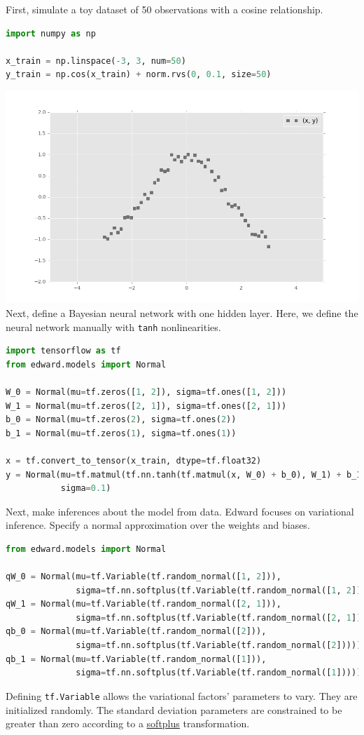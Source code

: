 First, simulate a toy dataset of 50 observations with a cosine relationship.
\begin{lstlisting}[language=Python]
import numpy as np

x_train = np.linspace(-3, 3, num=50)
y_train = np.cos(x_train) + norm.rvs(0, 0.1, size=50)
\end{lstlisting}
\includegraphics[width=700px]{images/getting-started-fig0.png}
Next, define a Bayesian neural network with one hidden layer. Here, we
define the neural network manually with \texttt{tanh} nonlinearities.
\begin{lstlisting}[language=Python]
import tensorflow as tf
from edward.models import Normal

W_0 = Normal(mu=tf.zeros([1, 2]), sigma=tf.ones([1, 2]))
W_1 = Normal(mu=tf.zeros([2, 1]), sigma=tf.ones([2, 1]))
b_0 = Normal(mu=tf.zeros(2), sigma=tf.ones(2))
b_1 = Normal(mu=tf.zeros(1), sigma=tf.ones(1))

x = tf.convert_to_tensor(x_train, dtype=tf.float32)
y = Normal(mu=tf.matmul(tf.nn.tanh(tf.matmul(x, W_0) + b_0), W_1) + b_1,
           sigma=0.1)
\end{lstlisting}
Next, make inferences about the model from data.
Edward focuses on variational inference. Specify a normal
approximation over the weights and biases.
\begin{lstlisting}[language=Python]
from edward.models import Normal

qW_0 = Normal(mu=tf.Variable(tf.random_normal([1, 2])),
              sigma=tf.nn.softplus(tf.Variable(tf.random_normal([1, 2]))))
qW_1 = Normal(mu=tf.Variable(tf.random_normal([2, 1])),
              sigma=tf.nn.softplus(tf.Variable(tf.random_normal([2, 1]))))
qb_0 = Normal(mu=tf.Variable(tf.random_normal([2])),
              sigma=tf.nn.softplus(tf.Variable(tf.random_normal([2]))))
qb_1 = Normal(mu=tf.Variable(tf.random_normal([1])),
              sigma=tf.nn.softplus(tf.Variable(tf.random_normal([1]))))
\end{lstlisting}
Defining \texttt{tf.Variable} allows the variational factors'
parameters to vary. They are initialized randomly.  The standard
deviation parameters are constrained to be greater than zero according
to a
\href{https://en.wikipedia.org/wiki/Rectifier_(neural_networks)}{softplus}
transformation.

